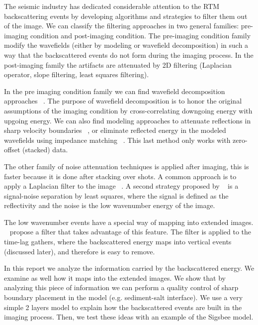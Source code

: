 The seismic industry has dedicated considerable attention to the RTM backscattering events by developing
algorithms and strategies to filter them out of the image. We can classify the filtering approaches in 
two general families: pre-imaging condition and post-imaging condition. The pre-imaging condition
family modify the wavefields (either by modeling or wavefield decomposition) in such a way that
the backscattered events do not form during the imaging process. In the post-imaging family
the artifacts are attenuated by 2D filtering (Laplacian operator, slope filtering, least squares
filtering).

In the pre imaging condition family we can find wavefield decomposition approaches
~\citep[]{liu:S29,fei:3130}. The purpose of wavefield decomposition is to honor the original
assumptions of the imaging condition by cross-correlating downgoing energy with upgoing energy.
We can also find modeling approaches to attenuate reflections in sharp velocity boundaries 
~\citep{fletcher:2049}, or eliminate reflected energy in the modeled wavefields using 
impedance matching ~\citep{baysal:132}. This last method only works with zero-offset (stacked) data.  

The other family of noise attenuation techniques is applied after imaging, this is faster because
it is done after stacking over shots. A common approach is to apply a Laplacian filter
to the image ~\citep{youn:246}. A second strategy proposed by ~\cite{guitton:S19} is a signal-noise
separation by least squares, where the signal is defined as the reflectivity and the noise is the low 
wavenumber energy of the image. 

The low wavenumber events have a special way of mapping into extended images. ~\cite{kaelin:3125} propose
a filter that takes advantage of this feature. The filter is applied to the time-lag gathers, where the
backscattered energy maps into vertical events (discussed later), and therefore is easy to remove.

In this report we analyze the information carried by the backscattered energy. We examine as well 
how it maps into the extended images. We show that by analyzing this piece of information we 
can perform a quality control of sharp boundary placement in the model (e.g. sediment-salt interface). 
We use a very simple 2 layers model to explain how the backscattered events are built in the imaging
process. Then, we test these ideas with an example of the Sigsbee model.

 



